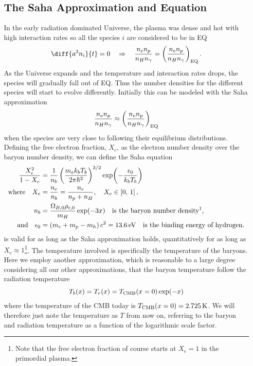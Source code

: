 \documentclass[10pt,a4paper]{article}
\begin{document}
\subsection{The Saha Approximation and Equation}
\label{subsec:Theory/Saha approximation and equation}
In the early radiation dominated Universe, the plasma was dense and hot with high interaction rates so all the species $i$ are considered to be in EQ
\begin{equation*}
    \diff{a^3n_i}{t} = 0 \quad \Rightarrow \quad \frac{n_e n_p}{n_H n_\gamma} = \left(\frac{n_e n_p}{n_H n_\gamma}\right)_{\rm{EQ}}.
\end{equation*}
As the Universe expands and the temperature and interaction rates drops, the species will gradually fall out of EQ. Thus the number densities for the different species will start to evolve differently. Initially this can be modeled with the Saha approximation
\begin{equation}
    \frac{n_e n_p}{n_H n_\gamma} \approx \left(\frac{n_e n_p}{n_H n_\gamma}\right)_{\rm{EQ}}
    \label{eq:Saha approximation}
\end{equation}
when the species are very close to following their equilibrium distributions. Defining the free electron fraction, $X_e$, as the electron number density over the baryon number density, we can define the Saha equation
\begin{align}
    \frac{X_e^2}{1-X_e} &= \frac{1}{n_b}\left(\frac{m_e k_b T_b}{2\pi \hbar^2}\right)^{3/2} \exp(-\frac{\epsilon_0}{k_b T_b}) \label{eq:Saha equation}
    \\
    \text{where} \quad X_e &= \frac{n_e}{n_b} = \frac{n_e}{n_p+n_H}, \quad X_e \in \left[0,\, 1\right], \label{eq:Free electron fraction}
    \\
    n_b &= \frac{\Omega_{B,0} \rho_{c,0}}{m_H}\exp(-3x) \quad \text{is the baryon number density\footnotemark,} \label{eq:baryon number density}
    \\
    \text{and} \quad \epsilon_0 &= \left(m_e + m_p - m_h\right)c^2 = \SI{13.6}{eV} \quad \text{is the binding energy of hydrogen.} \notag
\end{align}
%
 is valid for as long as the Saha approximation holds, quantitatively for as long as $X_e \approx 1$\footnote{Note that the free electron fraction of course starts at $X_e=1$ in the primordial plasma.}. The temperature involved is specifically the temperature of the baryons. Here we employ another approximation, which is reasonable to a large degree considering all our other approximations, that the baryon temperature follow the radiation temperature
\begin{equation}
    T_b(x) = T_r(x) = T_{\rm{CMB}}(x=0)\exp(-x)
\end{equation}
where the temperature of the CMB today is $T_{\rm{CMB}}(x=0) = \SI{2.725}{K}$. We will therefore just note the temperature as $T$ from now on, referring to the baryon and radiation temperature as a function of the logarithmic scale factor.
\end{document}
